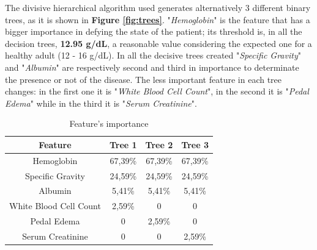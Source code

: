 \documentclass[10pt]{article}
\begin{document}
The divisive hierarchical algorithm used generates alternatively 3 different binary trees, as it is shown in \textbf{Figure \ref{fig:trees}}. "\textit{Hemoglobin}" is the feature that has a bigger importance in defying the state of the patient; its threshold is, in all the decision trees, \textbf{12.95 g/dL}, a reasonable value considering the expected one for a healthy adult (12 - 16 g/dL). In all the decisive trees created "\textit{Specific Gravity}" and "\textit{Albumin}" are respectively second and third in importance to determinate the presence or not of the disease. The less important feature in each tree changes: in the first one it is "\textit{White Blood Cell Count}", in the second it is "\textit{Pedal Edema}" while in the third it is "\textit{Serum Creatinine}".
\begin{table}{}
\centering
\begin{tabular}{cccc}
\hline
\textbf{Feature} & \textbf{Tree 1} & \textbf{Tree 2} & \textbf{Tree 3} \\ \hline
\multicolumn{1}{|c|}{Hemoglobin} & \multicolumn{1}{c|}{67,39\%} & \multicolumn{1}{c|}{67,39\%} & \multicolumn{1}{c|}{67,39\%} \\ \hline
\multicolumn{1}{|c|}{Specific Gravity} & \multicolumn{1}{c|}{24,59\%} & \multicolumn{1}{c|}{24,59\%} & \multicolumn{1}{c|}{24,59\%} \\ \hline
\multicolumn{1}{|c|}{Albumin} & \multicolumn{1}{c|}{5,41\%} & \multicolumn{1}{c|}{5,41\%} & \multicolumn{1}{c|}{5,41\%} \\ \hline
\multicolumn{1}{|c|}{White Blood Cell Count} & \multicolumn{1}{c|}{2,59\%} & \multicolumn{1}{c|}{0} & \multicolumn{1}{c|}{0} \\ \hline
\multicolumn{1}{|c|}{Pedal Edema} & \multicolumn{1}{c|}{0} & \multicolumn{1}{c|}{2,59\%} & \multicolumn{1}{c|}{0} \\ \hline
\multicolumn{1}{|c|}{Serum Creatinine} & \multicolumn{1}{c|}{0} & \multicolumn{1}{c|}{0} & \multicolumn{1}{c|}{2,59\%} \\ \hline


\end{tabular}
\caption{Feature's importance}
\label{table2}
\end{table} 
\end{document}
